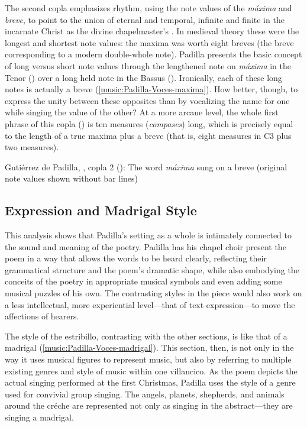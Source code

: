 The second copla emphasizes rhythm, using the note values of the \emph{máxima}
and \emph{breve}, to point to the union of eternal and temporal, infinite and
finite in the incarnate Christ as the divine chapelmaster's
.
In medieval theory these were the longest and shortest note values: the maxima
was worth eight breves (the breve corresponding to a modern double-whole note).
Padilla presents the basic concept of long versus short note values through the
lengthened note on \emph{máxima} in the Tenor () over a long
held note in the Bassus ().
Ironically, each of these long notes is actually a breve
(\cref{music:Padilla-Voces-maxima}).
How better, though, to express the unity between these opposites than by
vocalizing the name for one while singing the value of the other?
At a more arcane level, the whole first phrase of this copla
() is ten measures (\emph{compases}) long, which is precisely
equal to the length of a true maxima plus a breve (that is, eight measures in C3
plus two measures).

\begin{musicexample}
    \caption{Gutiérrez de Padilla, , copla 2
    (): The word \emph{máxima} sung on a breve (original note
    values shown without bar lines)}
  
    \label{music:Padilla-Voces-maxima}
\end{musicexample}


\subsection{Expression and Madrigal Style}

This analysis shows that Padilla's setting as a whole is intimately connected to
the sound and meaning of the poetry.
Padilla has his chapel choir present the poem in a way that allows the words to
be heard clearly, reflecting their grammatical structure and the poem's dramatic
shape, while also embodying the conceits of the poetry in appropriate musical
symbols and even adding some musical puzzles of his own.
The contrasting styles in the piece would also work on a less intellectual, more
experiential level---that of text expression---to move the affections of
hearers.

The style of the estribillo, contrasting with the other sections, is like that
of a madrigal (\cref{music:Padilla-Voces-madrigal}).
This section, then, is  not only in the way it uses
musical figures to represent music, but also by referring to multiple existing
genres and style of music within one villancico.
As the poem depicts the actual singing performed at the first Christmas, Padilla
uses the style of a genre used for convivial group singing.
The angels, planets, shepherds, and animals around the créche are represented
not only as singing in the abstract---they are singing a madrigal.

